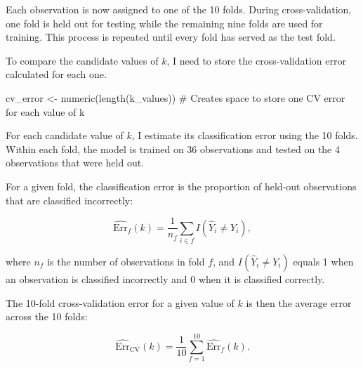 \documentclass[
  letterpaper,
  DIV=11,
  numbers=noendperiod]{scrreprt}
\newenvironment{Shaded}{\begin{snugshade}}{\end{snugshade}}
\newcommand{\CommentTok}[1]{\textcolor[rgb]{0.37,0.37,0.37}{#1}}
\newcommand{\FunctionTok}[1]{\textcolor[rgb]{0.28,0.35,0.67}{#1}}
\newcommand{\NormalTok}[1]{\textcolor[rgb]{0.00,0.23,0.31}{#1}}
\newcommand{\OtherTok}[1]{\textcolor[rgb]{0.00,0.23,0.31}{#1}}
\begin{document}
Each observation is now assigned to one of the 10 folds. During
cross-validation, one fold is held out for testing while the remaining
nine folds are used for training. This process is repeated until every
fold has served as the test fold.

To compare the candidate values of \(k\), I need to store the
cross-validation error calculated for each one.

\begin{Shaded}
\begin{Highlighting}[]
\NormalTok{cv\_error }\OtherTok{\textless{}{-}} \FunctionTok{numeric}\NormalTok{(}\FunctionTok{length}\NormalTok{(k\_values)) }\CommentTok{\# Creates space to store one CV error for each value of k}
\end{Highlighting}
\end{Shaded}

For each candidate value of \(k\), I estimate its classification error
using the 10 folds. Within each fold, the model is trained on 36
observations and tested on the 4 observations that were held out.

For a given fold, the classification error is the proportion of held-out
observations that are classified incorrectly:

\[
\widehat{\mathrm{Err}}_{f}(k)
=
\frac{1}{n_f}
\sum_{i \in f} I(\widehat{Y}_i \neq Y_i),
\]

where \(n_f\) is the number of observations in fold \(f\), and
\(I(\widehat{Y}_i \neq Y_i)\) equals 1 when an observation is classified
incorrectly and 0 when it is classified correctly.

The 10-fold cross-validation error for a given value of \(k\) is then
the average error across the 10 folds:

\[
\widehat{\mathrm{Err}}_{\mathrm{CV}}(k)
=
\frac{1}{10}
\sum_{f=1}^{10}
\widehat{\mathrm{Err}}_{f}(k).
\]
\end{document}

